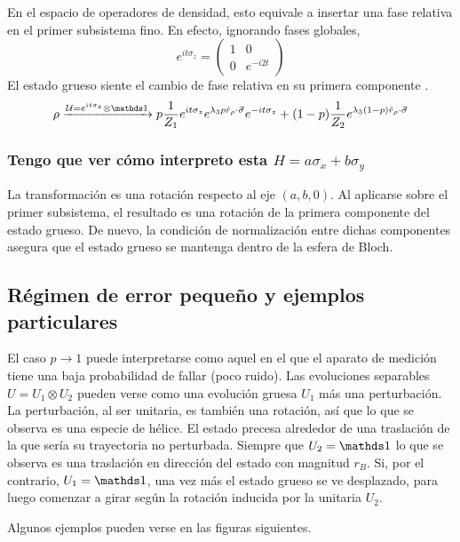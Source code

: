 En el espacio de operadores de densidad, esto equivale a insertar una fase relativa en el primer subsistema fino. En efecto, ignorando fases globales,
\begin{equation}
    e^{it\sigma_{z}}=\begin{pmatrix}
        1&0\\0&e^{-i2t}
    \end{pmatrix}
\end{equation}
El estado grueso siente el cambio de fase relativa en su primera componente .
\begin{equation}
    \rho\xrightarrow{\mcU=e^{it\sigma_{z}}\otimes \Id} p\frac{1}{Z_{1}}e^{it\sigma_{z}}e^{\lambda_{3}p\hat{r}_{\rho}\cdot\vec{\sigma}}e^{-it\sigma_{z}}+(1-p)\frac{1}{Z_{2}}e^{\lambda_{3}(1-p)\hat{r}_{\rho}\cdot\vec{\sigma}}
\end{equation}

\subsubsection{Tengo que ver cómo interpreto esta $H=a\sigma_{x}+b\sigma_{y}$}
La transformación es una rotación respecto al eje $(a,b,0)$. Al aplicarse sobre el primer subsistema, el resultado es una rotación de la primera componente del estado grueso. De nuevo, la condición de normalización entre dichas componentes asegura que el estado grueso se mantenga dentro de la esfera de Bloch. 

\subsection{Régimen de error pequeño y ejemplos particulares}

El caso $p\rightarrow 1$ puede interpretarse como aquel en el que el aparato de medición tiene una baja probabilidad de fallar (poco ruido). Las evoluciones separables $U=U_{1}\otimes U_{2}$ pueden verse como una evolución gruesa $U_{1}$ más una perturbación. La perturbación, al ser unitaria, es también una rotación, así que lo que se observa es una especie de hélice. El estado precesa alrededor de una traslación de la que sería su trayectoria no perturbada. Siempre que $U_{2}=\Id$ lo que se observa es una traslación en dirección del estado con magnitud $r_{B}$. Si, por el contrario, $U_{1}=\Id$, una vez más el estado grueso se ve desplazado, para luego comenzar a girar según la rotación inducida por la unitaria $U_{2}$. 

Algunos ejemplos pueden verse en las figuras siguientes.
